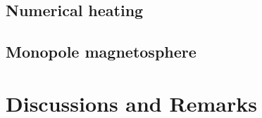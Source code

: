 \subsection{Numerical heating}
\label{sec:test-heating}

\subsection{Monopole magnetosphere}
\label{sec:test-monopole}





\section{Discussions and Remarks}
\label{sec:code-discussions}

